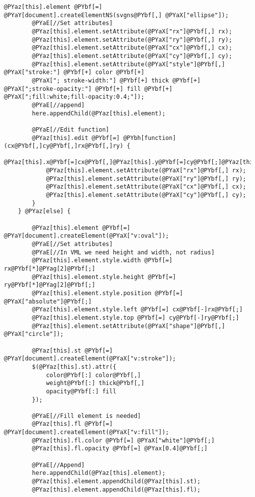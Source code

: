 \begin{Verbatim}[commandchars=@\[\]]
        @PYaz[this].element @PYbf[=] @PYaY[document].createElementNS(svgns@PYbf[,] @PYaX["ellipse"]);
		@PYaE[//Set attributes]
        @PYaz[this].element.setAttribute(@PYaX["rx"]@PYbf[,] rx);
        @PYaz[this].element.setAttribute(@PYaX["ry"]@PYbf[,] ry);
        @PYaz[this].element.setAttribute(@PYaX["cx"]@PYbf[,] cx);
        @PYaz[this].element.setAttribute(@PYaX["cy"]@PYbf[,] cy);
        @PYaz[this].element.setAttribute(@PYaX["style"]@PYbf[,] @PYaX["stroke:"] @PYbf[+] color @PYbf[+] 
		@PYaX["; stroke-width:"] @PYbf[+] thick @PYbf[+] @PYaX[";stroke-opacity:"] @PYbf[+] fill @PYbf[+] @PYaX[";fill:white;fill-opacity:0.4;"]);
		@PYaE[//append]
		here.appendChild(@PYaz[this].element);
		
		@PYaE[//Edit function]
		@PYaz[this].edit @PYbf[=] @PYbh[function](cx@PYbf[,]cy@PYbf[,]rx@PYbf[,]ry) {
			@PYaz[this].x@PYbf[=]cx@PYbf[,]@PYaz[this].y@PYbf[=]cy@PYbf[;]@PYaz[this].rx@PYbf[=]rx@PYbf[;]@PYaz[this].ry@PYbf[=]ry@PYbf[;]
			@PYaz[this].element.setAttribute(@PYaX["rx"]@PYbf[,] rx);
	        @PYaz[this].element.setAttribute(@PYaX["ry"]@PYbf[,] ry);
	        @PYaz[this].element.setAttribute(@PYaX["cx"]@PYbf[,] cx);
	        @PYaz[this].element.setAttribute(@PYaX["cy"]@PYbf[,] cy);
		}
	} @PYaz[else] {
		
		@PYaz[this].element @PYbf[=] @PYaY[document].createElement(@PYaX["v:oval"]);
		@PYaE[//Set attributes]
		@PYaE[//In VML we need height and width, not radius]
        @PYaz[this].element.style.width @PYbf[=] rx@PYbf[*]@PYag[2]@PYbf[;]
        @PYaz[this].element.style.height @PYbf[=] ry@PYbf[*]@PYag[2]@PYbf[;]
        @PYaz[this].element.style.position @PYbf[=] @PYaX["absolute"]@PYbf[;]
        @PYaz[this].element.style.left @PYbf[=] cx@PYbf[-]rx@PYbf[;]
        @PYaz[this].element.style.top @PYbf[=] cy@PYbf[-]ry@PYbf[;]
        @PYaz[this].element.setAttribute(@PYaX["shape"]@PYbf[,] @PYaX["circle"]);
        
		@PYaz[this].st @PYbf[=] @PYaY[document].createElement(@PYaX["v:stroke"]);
        $(@PYaz[this].st).attr({
            color@PYbf[:] color@PYbf[,]
            weight@PYbf[:] thick@PYbf[,]
            opacity@PYbf[:] fill
        });

		@PYaE[//Fill element is needed]
        @PYaz[this].fl @PYbf[=] @PYaY[document].createElement(@PYaX["v:fill"]);
		@PYaz[this].fl.color @PYbf[=] @PYaX["white"]@PYbf[;]
        @PYaz[this].fl.opacity @PYbf[=] @PYax[0.4]@PYbf[;] 
		
		@PYaE[//Append]
		here.appendChild(@PYaz[this].element);
		@PYaz[this].element.appendChild(@PYaz[this].st);
		@PYaz[this].element.appendChild(@PYaz[this].fl);
		

\end{Verbatim}
